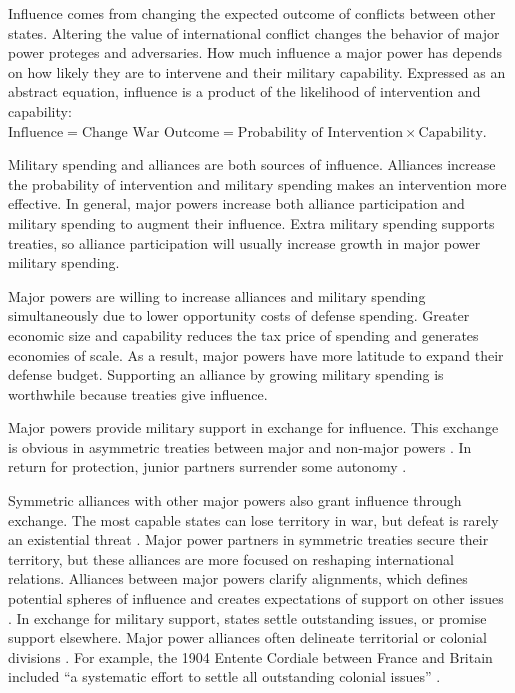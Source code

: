 \documentclass[12pt]{article}
\begin{document}
Influence comes from changing the expected outcome of conflicts between other states.
Altering the value of international conflict changes the behavior of major power proteges and adversaries.  
How much influence a major power has depends on how likely they are to intervene and their military capability. 
Expressed as an abstract equation, influence is a product of the likelihood of intervention and capability: $\mbox{Influence} = \mbox{Change War Outcome} = \mbox{Probability of Intervention} \times \mbox{Capability}$.


Military spending and alliances are both sources of influence. 
Alliances increase the probability of intervention and military spending makes an intervention more effective. 
In general, major powers increase both alliance participation and military spending to augment their influence.
Extra military spending supports treaties, so alliance participation will usually increase growth in major power military spending. 


Major powers are willing to increase alliances and military spending simultaneously due to lower opportunity costs of defense spending. 
Greater economic size and capability reduces the tax price of spending and generates economies of scale. 
As a result, major powers have more latitude to expand their defense budget.  
Supporting an alliance by growing military spending is worthwhile because treaties give influence. 


Major powers provide military support in exchange for influence. 
This exchange is obvious in asymmetric treaties between major and non-major powers \citep{Morrow1991}. 
In return for protection, junior partners surrender some autonomy \citep{Lake2009}. 


Symmetric alliances with other major powers also grant influence through exchange.
The most capable states can lose territory in war, but defeat is rarely an existential threat \citep{Fazal2011}.  
Major power partners in symmetric treaties secure their territory, but these alliances are more focused on reshaping international relations. 
Alliances between major powers clarify alignments, which defines potential spheres of influence and creates expectations of support on other issues \citep{Snyder1997}. 
In exchange for military support, states settle outstanding issues, or promise support elsewhere. 
Major power alliances often delineate territorial or colonial divisions \cite{Langer1950, Kissinger1994}.
For example, the 1904 Entente Cordiale between France and Britain included ``a systematic effort to settle all outstanding colonial issues'' \citep[pg. 189]{Kissinger1994}.   
\end{document}
